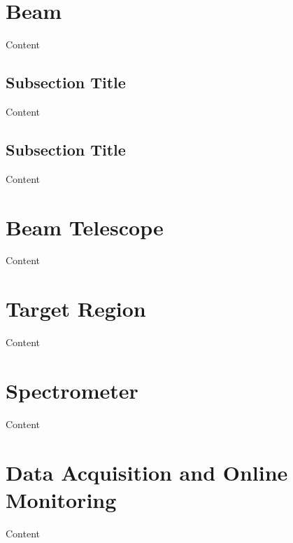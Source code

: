 \section{Beam}

Content


\subsection{Subsection Title}

Content


\subsection{Subsection Title}

Content


\section{Beam Telescope}

Content


\section{Target Region}

Content


\section{Spectrometer}

Content


\section{Data Acquisition and Online Monitoring}

Content
